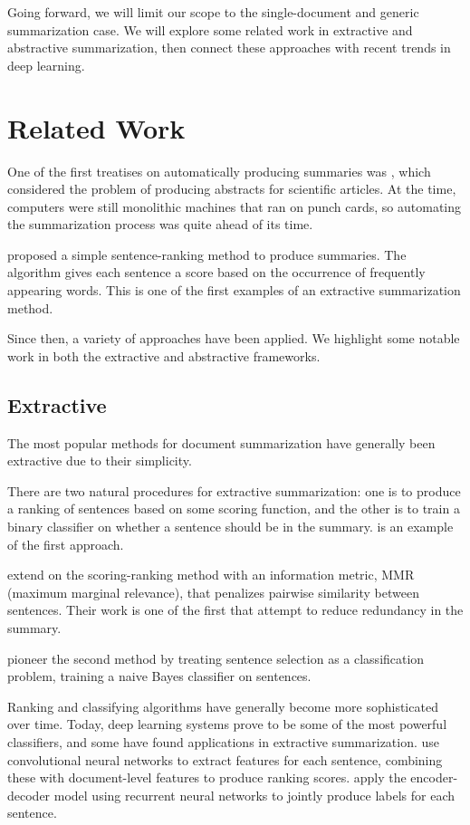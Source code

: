 \documentclass[12pt]{report}
\begin{document}
Going forward, we will limit our scope to the single-document and generic summarization case. We will explore some related work in extractive and abstractive summarization, then connect these approaches with recent trends in deep learning.

\section{Related Work}

One of the first treatises on automatically producing summaries was \citet{luhn1958automatic}, which considered the problem of producing abstracts for scientific articles. At the time, computers were still monolithic machines that ran on punch cards, so automating the summarization process was quite ahead of its time.

\citet{luhn1958automatic} proposed a simple sentence-ranking method to produce summaries. The algorithm gives each sentence a score based on the occurrence of frequently appearing words. This is one of the first examples of an extractive summarization method.

Since then, a variety of approaches have been applied. We highlight some notable work in both the extractive and abstractive frameworks.

\subsection{Extractive}
The most popular methods for document summarization have generally been extractive due to their simplicity.

There are two natural procedures for extractive summarization: one is to produce a ranking of sentences based on some scoring function, and the other is to train a binary classifier on whether a sentence should be in the summary. \citet{luhn1958automatic} is an example of the first approach.

\citet{Carbonell1998} extend on the scoring-ranking method with an information metric, MMR (maximum marginal relevance), that penalizes pairwise similarity between sentences. Their work is one of the first that attempt to reduce redundancy in the summary.

\citet{Kupiec1995} pioneer the second method by treating sentence selection as a classification problem, training a naive Bayes classifier on sentences.

Ranking and classifying algorithms have generally become more sophisticated over time. Today, deep learning systems prove to be some of the most powerful classifiers, and some have found applications in extractive summarization.
\citet{Cao2015} use convolutional neural networks to extract features for each sentence, combining these with document-level features to produce ranking scores.
\citet{Cheng2016} apply the encoder-decoder model using recurrent neural networks to jointly produce labels for each sentence.
\end{document}
